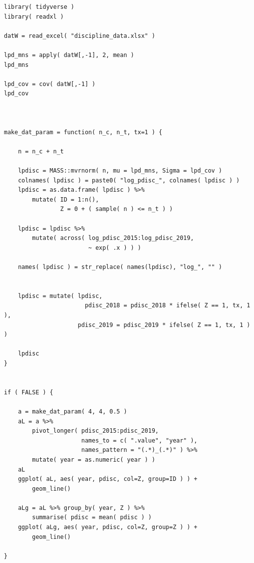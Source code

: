 \documentclass[
]{book}
\begin{document}
\begin{verbatim}
library( tidyverse )
library( readxl )

datW = read_excel( "discipline_data.xlsx" )

lpd_mns = apply( datW[,-1], 2, mean )
lpd_mns

lpd_cov = cov( datW[,-1] )
lpd_cov



make_dat_param = function( n_c, n_t, tx=1 ) {
    
    n = n_c + n_t
    
    lpdisc = MASS::mvrnorm( n, mu = lpd_mns, Sigma = lpd_cov )
    colnames( lpdisc ) = paste0( "log_pdisc_", colnames( lpdisc ) )
    lpdisc = as.data.frame( lpdisc ) %>%
        mutate( ID = 1:n(),
                Z = 0 + ( sample( n ) <= n_t ) )
    
    lpdisc = lpdisc %>%
        mutate( across( log_pdisc_2015:log_pdisc_2019,
                        ~ exp( .x ) ) )
    
    names( lpdisc ) = str_replace( names(lpdisc), "log_", "" )
    
  
    lpdisc = mutate( lpdisc, 
                       pdisc_2018 = pdisc_2018 * ifelse( Z == 1, tx, 1 ),
                     pdisc_2019 = pdisc_2019 * ifelse( Z == 1, tx, 1 ) )
 
    lpdisc
}


if ( FALSE ) {
    
    a = make_dat_param( 4, 4, 0.5 )  
    aL = a %>% 
        pivot_longer( pdisc_2015:pdisc_2019, 
                      names_to = c( ".value", "year" ),
                      names_pattern = "(.*)_(.*)" ) %>%
        mutate( year = as.numeric( year ) )
    aL
    ggplot( aL, aes( year, pdisc, col=Z, group=ID ) ) +
        geom_line()
    
    aLg = aL %>% group_by( year, Z ) %>%
        summarise( pdisc = mean( pdisc ) )
    ggplot( aLg, aes( year, pdisc, col=Z, group=Z ) ) +
        geom_line()
    
}
\end{verbatim}
\end{document}
